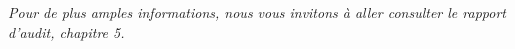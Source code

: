 \textit{Pour de plus amples informations, nous vous invitons à aller consulter le rapport d'audit, chapitre 5.}



















